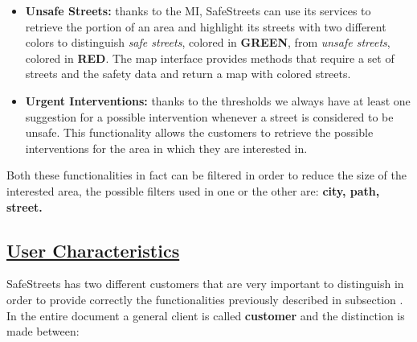 		 \begin{itemize}
		 	\item \textbf{Unsafe Streets:} thanks to the MI, SafeStreets can use its services to retrieve the portion of an area and highlight its streets with two different colors to distinguish \emph{safe streets}, colored in \textbf{GREEN}, from \emph{unsafe streets}, colored in \textbf{RED}. The map interface provides methods that require a set of streets and the safety data and return a map with colored streets. 
		 	
		 	\item \textbf{Urgent Interventions:} thanks to the thresholds we always have at least one suggestion for a possible intervention whenever a street is considered to be unsafe. This functionality allows the customers to retrieve the possible interventions for the area in which they are interested in.
		 \end{itemize}
	 
	 	Both these functionalities in fact can be filtered in order to reduce the size of the interested area, the possible filters used in one or the other are: \textbf{city, path, street.}
		
\subsection[User Characteristics]{\hyperlink{toc}{User Characteristics}}
	\label{sec:userCharacteristics}
	SafeStreets has two different customers that are very important to distinguish in order to provide correctly the functionalities previously described in subsection . In the entire document a general client is called \textbf{customer} and the distinction is made between:
	
